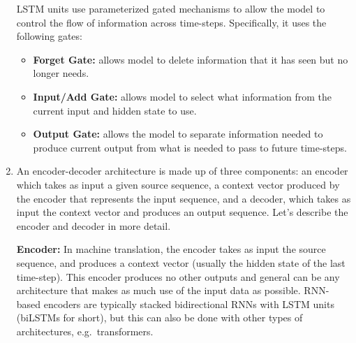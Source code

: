 \documentclass[11pt,a4paper]{article}
\begin{document}
\begin{enumerate}[label=(\alph*)]
          LSTM units use parameterized gated mechanisms to allow the model to
          control the flow of information across time-steps. Specifically, it
          uses the following gates:
          \begin{itemize}
              \item \textbf{Forget Gate:} allows model to delete information
                    that it has seen but no longer needs.
              \item \textbf{Input/Add Gate:} allows model to select what
                    information from the current input and hidden state to use.
              \item \textbf{Output Gate:} allows the model to separate
                    information needed to produce current output from what is
                    needed to pass to future time-steps.
          \end{itemize}
    \item An encoder-decoder architecture is made up of three components: an
          encoder which takes as input a given source sequence, a context vector
          produced by the encoder that represents the input sequence, and a
          decoder, which takes as input the context vector and produces an
          output sequence.
          Let's describe the encoder and decoder in more detail.

          \textbf{Encoder:} In machine translation, the encoder takes as input
          the source sequence, and produces a context vector (usually the
          hidden state of the last time-step).
          This encoder produces no other outputs and general can be any
          architecture that makes as much use of the input data as possible.
          RNN-based encoders are typically stacked bidirectional RNNs with LSTM
          units (biLSTMs for short), but this can also be done with other types
          of architectures, e.g.\ transformers.


\end{enumerate}
\end{document}

